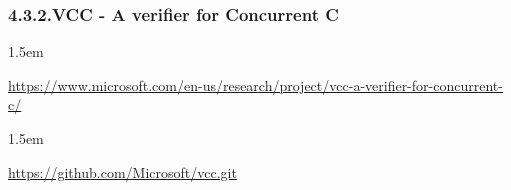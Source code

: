 \documentclass[12pt,twoside]{article}
\begin{document}
\subsubsection{4.3.2.\hspace*{0.5em}VCC - A verifier for Concurrent C}\label{sec-vcc---a-verifier-for-concurrent-c}%

\begin{mddefinitions}%


\begin{mdbmarginx}{}{}{}{1.5em}%
\begin{mddefdata}%
\href{https://www.microsoft.com/en-us/research/project/vcc-a-verifier-for-concurrent-c/}{{\ttfamily https://\hspace{0pt}www.\hspace{0pt}microsoft.\hspace{0pt}com/\hspace{0pt}en-\hspace{0pt}us/\hspace{0pt}research/\hspace{0pt}project/\hspace{0pt}vcc-\hspace{0pt}a-\hspace{0pt}verifier-\hspace{0pt}for-\hspace{0pt}concurrent-\hspace{0pt}c/\hspace{0pt}}}
\end{mddefdata}%
\end{mdbmarginx}%


\begin{mdbmarginx}{}{}{}{1.5em}%
\begin{mddefdata}%
\href{https://github.com/Microsoft/vcc.git}{{\ttfamily https://\hspace{0pt}github.\hspace{0pt}com/\hspace{0pt}Microsoft/\hspace{0pt}vcc.\hspace{0pt}git}}%
\end{mddefdata}%
\end{mdbmarginx}%
\end{mddefinitions}%
\end{document}
